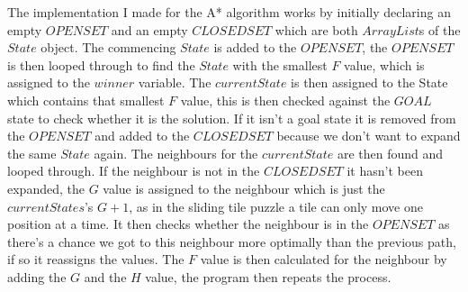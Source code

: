 \documentclass[final]{cmpreport}
\begin{document}
The implementation I made for the A* algorithm works by initially declaring an empty $OPENSET$ and an empty $CLOSEDSET$ which are both  $ArrayList$s of the $State$ object. The commencing $State$ is added to the $OPENSET$, the $OPENSET$ is then looped through to find the $State$ with the smallest $F$ value, which is assigned to the $winner$ variable. The $currentState$ is then assigned to the State which contains that smallest $F$ value, this is then checked against the $GOAL$ state to check whether it is the solution. If it isn't a goal state it is removed from the $OPENSET$ and added to the $CLOSEDSET$ because we don't want to expand the same $State$ again.
The neighbours for the $currentState$ are then found and looped through. If the neighbour is not in the $CLOSEDSET$ it hasn't been expanded, the $G$ value is assigned to the neighbour which is just the $currentStates$'s $G+1$, as in the sliding tile puzzle a tile can only move one position at a time. It then checks whether the neighbour is in the $OPENSET$ as there's a chance we got to this neighbour more optimally than the previous path, if so it reassigns the values. The $F$ value is then calculated for the neighbour by adding the $G$ and the $H$ value, the program then repeats the process.
\end{document}
